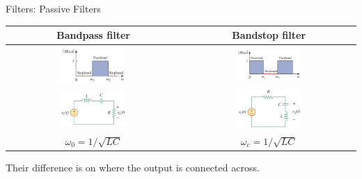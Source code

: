 \documentclass{beamer}
\begin{document}
\begin{frame}{Filters: Passive Filters}

\begin{table}[]
    \centering
    \begin{tabular}{cc}
        \toprule
        \textbf{Bandpass filter} & \textbf{Bandstop filter}  \\
        \midrule
        \includegraphics[width=0.4\textwidth]{C14/bandpass_diagram.jpeg}
         &
         \includegraphics[width=0.4\textwidth]{C14/bandstao_diagram.jpeg}
         \\
        \includegraphics[width=0.4\textwidth]{C14/bandpass.jpeg}
        & 
        \includegraphics[width=0.4\textwidth]{C14/bandstop.jpeg}
        \\
        $\omega_0 = 1/\sqrt{LC}$ & $\omega_c = 1/\sqrt{LC}$ \\
        \bottomrule
    \end{tabular}
\end{table}

Their difference is on where the output is connected across.

\end{frame}

\end{document}
